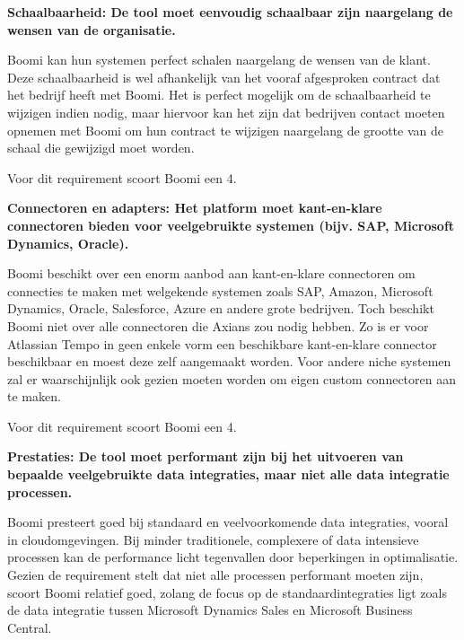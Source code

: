 \textbf{Schaalbaarheid: De tool moet eenvoudig schaalbaar zijn naargelang de wensen van de organisatie.}

\vspace{\baselineskip}

Boomi kan hun systemen perfect schalen naargelang de wensen van de klant. Deze schaalbaarheid is wel afhankelijk van het vooraf afgesproken contract dat het bedrijf heeft met Boomi. Het is perfect mogelijk om de schaalbaarheid te wijzigen indien nodig, maar hiervoor kan het zijn dat bedrijven contact moeten opnemen met Boomi om hun contract te wijzigen naargelang de grootte van de schaal die gewijzigd moet worden.

Voor dit requirement scoort Boomi een 4.


\vspace{\baselineskip}

\textbf{Connectoren en adapters: Het platform moet kant-en-klare connectoren bieden voor veelgebruikte systemen (bijv. SAP, Microsoft Dynamics, Oracle).}
\vspace{\baselineskip}

Boomi beschikt over een enorm aanbod aan kant-en-klare connectoren om connecties te maken met welgekende systemen zoals SAP, Amazon, Microsoft Dynamics, Oracle, Salesforce, Azure en andere grote bedrijven. Toch beschikt Boomi niet over alle connectoren die Axians zou nodig hebben. Zo is er voor Atlassian Tempo in geen enkele vorm een beschikbare kant-en-klare connector beschikbaar en moest deze zelf aangemaakt worden. Voor andere niche systemen zal er waarschijnlijk ook gezien moeten worden om eigen custom connectoren aan te maken.  

Voor dit requirement scoort Boomi een 4.


\vspace{\baselineskip}

\textbf{Prestaties: De tool moet performant zijn bij het uitvoeren van bepaalde veelgebruikte data integraties, maar niet alle data integratie processen.}

\vspace{\baselineskip}

Boomi presteert goed bij standaard en veelvoorkomende data integraties, vooral in cloudomgevingen. Bij minder traditionele, complexere of data intensieve processen kan de performance licht tegenvallen door beperkingen in optimalisatie. Gezien de requirement stelt dat niet alle processen performant moeten zijn, scoort Boomi relatief goed, zolang de focus op de standaardintegraties ligt zoals de data integratie tussen Microsoft Dynamics Sales en Microsoft Business Central.

